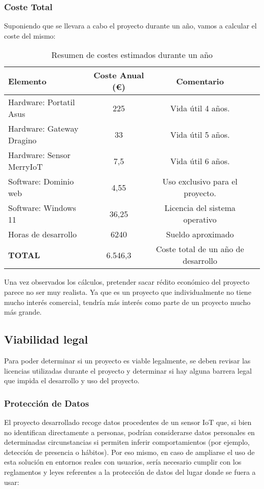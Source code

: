 \subsubsection{Coste Total}
Suponiendo que se llevara a cabo el proyecto durante un año, vamos a calcular el coste del mismo:
\begin{table}[H]
\centering
\begin{tabular}{|l|c|c|p{5cm}|}
\hline
\textbf{Elemento} & \textbf{Coste Anual (€)} & \textbf{Comentario} \\
\hline
Hardware: Portatil Asus & 225  & Vida útil 4 años. \\
\hline
Hardware: Gateway Dragino & 33  & Vida útil 5 años. \\
\hline
Hardware: Sensor MerryIoT & 7,5  & Vida útil 6 años. \\
\hline
Software: Dominio web & 4,55 & Uso exclusivo para el proyecto. \\
\hline
Software: Windows 11 & 36,25  & Licencia del sistema operativo \\
\hline
Horas de desarrollo & 6240  & Sueldo aproximado \\
\hline
\textbf{TOTAL} & 6.546,3  & Coste total de un año de desarrollo \\
\hline
\end{tabular}
\caption{Resumen de costes estimados durante un año}
\label{tab:viabilidad-economica}
\end{table}
Una vez observados los cálculos, pretender sacar rédito económico del proyecto parece no ser muy realista. Ya que es un proyecto que individualmente no tiene mucho interés comercial, tendría más interés como parte de un proyecto mucho más grande. 

\subsection{Viabilidad legal}
Para poder determinar si un proyecto es viable legalmente, se deben revisar las licencias utilizadas durante el proyecto y determinar si hay alguna barrera legal que impida el desarrollo y uso del proyecto.


\subsubsection{Protección de Datos}

El proyecto desarrollado recoge datos procedentes de un sensor IoT que, si bien no identifican directamente a personas, podrían considerarse datos personales en determinadas circunstancias si permiten inferir comportamientos (por ejemplo, detección de presencia o hábitos). Por eso mismo, en caso de ampliarse el uso de esta solución en entornos reales con usuarios, sería necesario cumplir con los reglamentos y leyes referentes a la protección de datos del lugar donde se fuera a usar:


